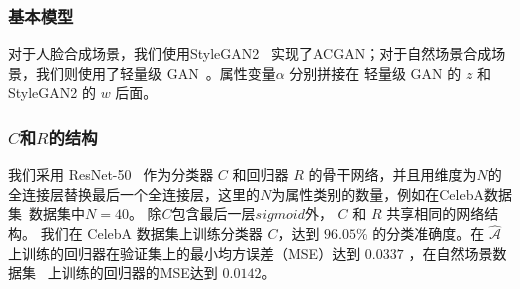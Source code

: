 \subsubsection{基本模型} 
对于人脸合成场景，我们使用StyleGAN2~\cite{stylegan2} 实现了ACGAN；对于自然场景合成场景，我们则使用了轻量级 GAN~\cite{lwgan}。属性变量$\alpha$ 分别拼接在 轻量级 GAN 的 $z$ 和 StyleGAN2 的 $w$ 后面。

\subsubsection{$C$和$R$的结构}
我们采用 ResNet-50~\cite{resnet} 作为分类器 $C$ 和回归器 $R$ 的骨干网络，并且用维度为$N$的全连接层替换最后一个全连接层，这里的$N$为属性类别的数量，例如在CelebA数据集~\cite{celeba}数据集中$N=40$。 除$C$包含最后一层$sigmoid$外， $C$ 和 $R$ 共享相同的网络结构。 我们在 CelebA 数据集上训练分类器 $C$，达到 $96.05\%$ 的分类准确度。在 $\hat{\mathcal{A}}$ 上训练的回归器在验证集上的最小均方误差（MSE）达到 $0.0337$ ，在自然场景数据集~\cite{scenedataset} 上训练的回归器的MSE达到 $0.0142$。

